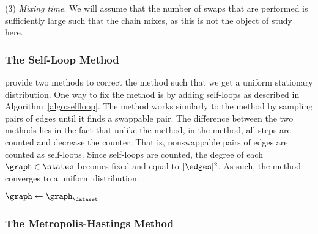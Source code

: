 (3) \textit{Mixing time}. We will assume that the number of swaps that are
performed is sufficiently large such that the chain mixes, as this is not the
object of study here.

\subsubsection{The Self-Loop Method}

\citet{GionisMMT07} provide two methods to correct the \naive{} method such
that we get a uniform stationary distribution. One way to fix the \naive{}
method is by adding self-loops as described in Algorithm~\ref{algo:selfloop}.
The \selfloop{} method works similarly to the \naive{} method by sampling pairs
of edges until it finds a swappable pair. The difference between the two
methods lies in the fact that unlike the \naive{} method, in the \selfloop{}
method, all steps are counted and decrease the counter. That is, nonswappable
pairs of edges are counted as self-loops. Since self-loops are counted, the
degree of each $\graph \in \states$ becomes fixed and equal to $|\edges|^2$. As
such, the \selfloop{} method converges to a uniform distribution.

\begin{algorithm}
	\caption{\selfloop}\label{algo:selfloop}
	\DontPrintSemicolon{}

	$\graph \leftarrow \graph_\dataset$\;
	\Return{$\graph$}
\end{algorithm}

\subsubsection{The Metropolis-Hastings Method}


